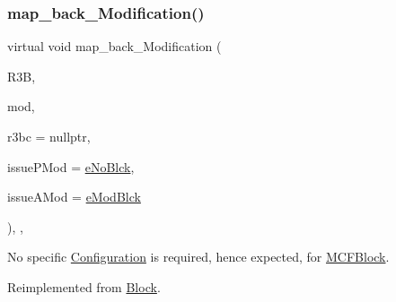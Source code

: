 \subsubsection{\texorpdfstring{map\+\_\+back\+\_\+\+Modification()}{map\_back\_Modification()}}
{\footnotesize\ttfamily virtual void map\+\_\+back\+\_\+\+Modification (\begin{DoxyParamCaption}\item[{\mbox{\hyperlink{class_s_m_spp__di__unipi__it_1_1_block}{Block}} $\ast$}]{R3B,  }\item[{\mbox{\hyperlink{group___modification___t_y_p_e_s_ga9024cf2ead61a1280d29771b063b1a62}{sp\+\_\+\+Mod}}}]{mod,  }\item[{\mbox{\hyperlink{class_s_m_spp__di__unipi__it_1_1_configuration}{Configuration}} $\ast$}]{r3bc = {\ttfamily nullptr},  }\item[{\mbox{\hyperlink{group___modification___t_y_p_e_s_ga544246d8c462e9a2d817c2c30797968f}{c\+\_\+\+Mod\+Param}}}]{issue\+P\+Mod = {\ttfamily \mbox{\hyperlink{group___modification___t_y_p_e_s_gga48fddcdd03a03f49b7e389ca1ed938d4ada69e89c5f46e563d8a13cfa6830c136}{e\+No\+Blck}}},  }\item[{\mbox{\hyperlink{group___modification___t_y_p_e_s_ga544246d8c462e9a2d817c2c30797968f}{c\+\_\+\+Mod\+Param}}}]{issue\+A\+Mod = {\ttfamily \mbox{\hyperlink{group___modification___t_y_p_e_s_gga48fddcdd03a03f49b7e389ca1ed938d4a21b14b26b1c0093a0905f6fc010bad29}{e\+Mod\+Blck}}} }\end{DoxyParamCaption})\hspace{0.3cm}{\ttfamily [final]}, {\ttfamily [override]}, {\ttfamily [virtual]}}

No specific \mbox{\hyperlink{class_s_m_spp__di__unipi__it_1_1_configuration}{Configuration}} is required, hence expected, for \mbox{\hyperlink{class_s_m_spp__di__unipi__it_1_1_m_c_f_block}{M\+C\+F\+Block}}. 

Reimplemented from \mbox{\hyperlink{class_s_m_spp__di__unipi__it_1_1_block_a9524f314b064aafbd8d2f8a398b797a2}{Block}}.

\mbox{\label{class_s_m_spp__di__unipi__it_1_1_m_c_f_block_aaab5f3727d85b0084832d6956470f21f}} 

